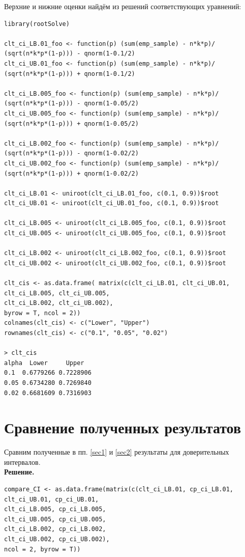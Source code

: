 \documentclass[14pt,a4paper]{scrartcl}
\begin{document}
\newpage
Верхние и нижние оценки найдём из решений соответствующих уравнений:
\begin{verbatim}
library(rootSolve)

clt_ci_LB.01_foo <- function(p) (sum(emp_sample) - n*k*p)/
(sqrt(n*k*p*(1-p))) - qnorm(1-0.1/2)
clt_ci_UB.01_foo <- function(p) (sum(emp_sample) - n*k*p)/
(sqrt(n*k*p*(1-p))) + qnorm(1-0.1/2)

clt_ci_LB.005_foo <- function(p) (sum(emp_sample) - n*k*p)/
(sqrt(n*k*p*(1-p))) - qnorm(1-0.05/2)
clt_ci_UB.005_foo <- function(p) (sum(emp_sample) - n*k*p)/
(sqrt(n*k*p*(1-p))) + qnorm(1-0.05/2)

clt_ci_LB.002_foo <- function(p) (sum(emp_sample) - n*k*p)/
(sqrt(n*k*p*(1-p))) - qnorm(1-0.02/2)
clt_ci_UB.002_foo <- function(p) (sum(emp_sample) - n*k*p)/
(sqrt(n*k*p*(1-p))) + qnorm(1-0.02/2)

clt_ci_LB.01 <- uniroot(clt_ci_LB.01_foo, c(0.1, 0.9))$root
clt_ci_UB.01 <- uniroot(clt_ci_UB.01_foo, c(0.1, 0.9))$root

clt_ci_LB.005 <- uniroot(clt_ci_LB.005_foo, c(0.1, 0.9))$root
clt_ci_UB.005 <- uniroot(clt_ci_UB.005_foo, c(0.1, 0.9))$root

clt_ci_LB.002 <- uniroot(clt_ci_LB.002_foo, c(0.1, 0.9))$root
clt_ci_UB.002 <- uniroot(clt_ci_UB.002_foo, c(0.1, 0.9))$root

clt_cis <- as.data.frame( matrix(c(clt_ci_LB.01, clt_ci_UB.01,
clt_ci_LB.005, clt_ci_UB.005,
clt_ci_LB.002, clt_ci_UB.002), 
byrow = T, ncol = 2))
colnames(clt_cis) <- c("Lower", "Upper")
rownames(clt_cis) <- c("0.1", "0.05", "0.02")

> clt_cis
alpha  Lower     Upper
0.1  0.6779266 0.7228906
0.05 0.6734280 0.7269840
0.02 0.6681609 0.7316903
\end{verbatim}

\section{Сравнение полученных результатов}
Сравним полученные в пп. \ref{sec1} и \ref{sec2} результаты для доверительных интервалов.\\
\textbf{Решение.}\\
\begin{verbatim}
compare_CI <- as.data.frame(matrix(c(clt_ci_LB.01, cp_ci_LB.01, 
clt_ci_UB.01, cp_ci_UB.01,
clt_ci_LB.005, cp_ci_LB.005,
clt_ci_UB.005, cp_ci_UB.005,
clt_ci_LB.002, cp_ci_LB.002,
clt_ci_UB.002, cp_ci_UB.002), 
ncol = 2, byrow = T))
\end{verbatim}
\end{document}
